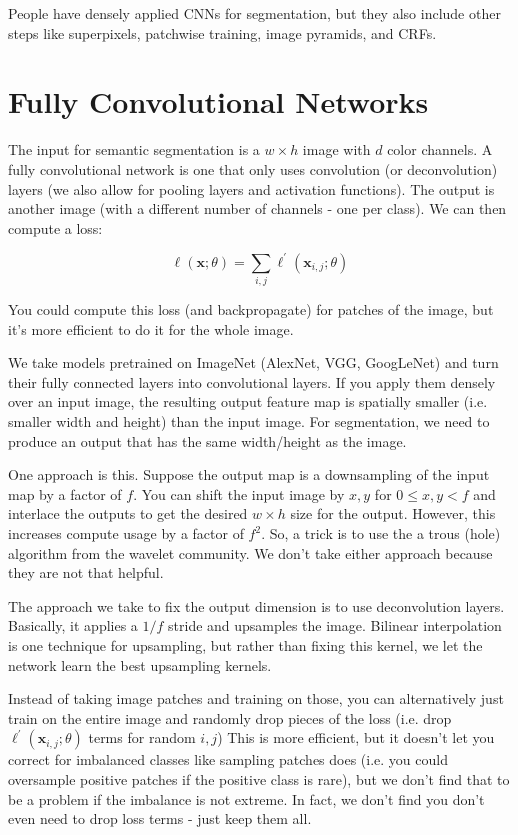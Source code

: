 \documentclass[a4paper]{article}
\begin{document}
People have densely applied CNNs for segmentation, but they also include other
steps like superpixels, patchwise training, image pyramids, and CRFs.

\section{Fully Convolutional Networks}
The input for semantic segmentation is a $w \times h$ image with $d$ color
channels. A fully convolutional network is one that only uses convolution (or
deconvolution) layers (we also allow for pooling layers and activation
functions). The output is another image (with a different number of channels
- one per class). We can then compute a loss:

$$
\ell(\mathbf{x}; \theta) = \sum_{i, j}{\ell^{'}(\mathbf{x}_{i, j}; \theta)}
$$

You could compute this loss (and backpropagate) for patches of the image, but
it's more efficient to do it for the whole image.

We take models pretrained on ImageNet (AlexNet, VGG, GoogLeNet) and turn their
fully connected layers into convolutional layers. If you apply them densely
over an input image, the resulting output feature map is spatially smaller (i.e.
smaller width and height) than the input image. For segmentation, we need to
produce an output that has the same width/height as the image.

One approach is this. Suppose the output map is a downsampling of the input
map by a factor of $f$. You can shift the input image by $x, y$ for $0 \leq
x, y < f$ and interlace the outputs to get the desired $w \times h$ size for
the output. However, this increases compute usage by a factor of $f^2$. So,
a trick is to use the a trous (hole) algorithm from the wavelet community.
We don't take either approach because they are not that helpful.

The approach we take to fix the output dimension is to use deconvolution layers.
Basically, it applies a $1/f$ stride and upsamples the image. Bilinear
interpolation is one technique for upsampling, but rather than fixing this
kernel, we let the network learn the best upsampling kernels.

Instead of taking image patches and training on those, you can alternatively
just train on the entire image and randomly drop pieces of the loss (i.e. drop
$\ell^{'}(\mathbf{x}_{i, j}; \theta)$ terms for random $i, j$) This is more
efficient, but it doesn't let you correct for imbalanced classes like sampling
patches does (i.e. you could oversample positive patches if the positive class
is rare), but we don't find that to be a problem if the imbalance is not
extreme. In fact, we don't find you don't even need to drop loss terms - just
keep them all.
\end{document}
